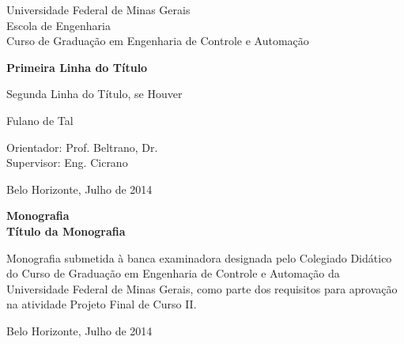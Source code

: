 \begin{titlepage}
\begin{center}
{\large Universidade Federal de Minas Gerais\\
Escola de Engenharia \\
Curso de Graduação em Engenharia de Controle e Automação\\}

\vspace{6cm}
{\bf\Large Primeira Linha do Título\vspace{0.2cm}

Segunda Linha do Título, se Houver}
\vspace{4cm}

{\large Fulano de Tal}
\vspace{2cm}  
   
\vspace{2cm}          
{\large Orientador: Prof. Beltrano, Dr.}\\
{\large Supervisor: Eng. Cicrano}

\vfill
{\large Belo Horizonte, Julho de 2014 }
\end{center}

\end{titlepage}

\newpage
\clearpage
\thispagestyle{empty}


\begin{titlepage}

\centering
\textbf{Monografia}\\
\vspace{2cm}
\centering
\textbf{Título da Monografia}\\
\vspace{5cm} 

\parbox{1.0\textwidth} 
{\large 
Monografia submetida à banca examinadora
designada pelo Colegiado Didático do Curso de
Graduação em Engenharia de Controle e
Automação da Universidade Federal de Minas
Gerais, como parte dos requisitos para aprovação na
atividade Projeto Final de Curso II.}

\vspace{7cm} 
\centering
Belo Horizonte, Julho de 2014

\end{titlepage}

